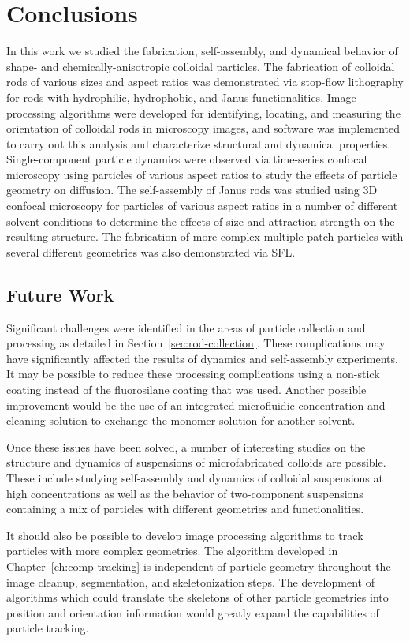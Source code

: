 \chapter{Conclusions}
\label{ch:conclusions}

In this work we studied the fabrication, self-assembly, and dynamical behavior
of shape- and chemically-anisotropic colloidal particles.  The fabrication 
of colloidal rods of various sizes and aspect ratios was demonstrated via
stop-flow lithography for rods with
hydrophilic, hydrophobic, and Janus functionalities.  Image processing algorithms
were developed for identifying, locating, and measuring the orientation of 
colloidal rods in microscopy images, and software was implemented to carry out
this analysis and characterize structural and dynamical properties.
Single-component particle 
dynamics were observed via time-series confocal microscopy using particles of 
various aspect ratios to study the effects of particle geometry on diffusion.
The self-assembly of Janus rods was studied using
3D confocal microscopy for particles of various aspect ratios
in a number of different solvent conditions to determine the effects of size 
and attraction strength on the resulting structure.  The fabrication of more complex
multiple-patch particles with several different geometries was also demonstrated via SFL.

\section{Future Work}

Significant challenges were identified in the areas of particle collection and processing as 
detailed in Section~\ref{sec:rod-collection}. These complications may have significantly affected the 
results of dynamics and self-assembly experiments.  It may be possible to reduce these
processing complications using a non-stick coating instead of the fluorosilane coating 
that was used.  Another possible improvement would be the use of an
integrated microfluidic concentration
and cleaning solution to exchange the monomer solution for another solvent.

Once these issues have been solved, a number of interesting studies on the structure and
dynamics of suspensions of microfabricated colloids are possible.  These include studying 
self-assembly and dynamics of colloidal suspensions at high concentrations as well as 
the behavior of two-component suspensions containing a mix of particles with different geometries and
functionalities.

It should also be possible to develop image processing algorithms to track particles with more
complex geometries.  The algorithm developed in Chapter~\ref{ch:comp-tracking} is independent 
of particle geometry throughout the image cleanup, segmentation, and skeletonization steps.
The development of algorithms which could translate the skeletons of other particle 
geometries into position and orientation information would greatly expand the 
capabilities of particle tracking.
